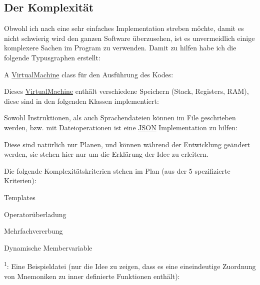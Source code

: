 \subsection*{Der Komplexität}

Obwohl ich nach eine sehr einfaches Implementation streben möchte, damit es nicht schwierig wird den ganzen Software überzusehen, ist es unvermeidlich einige komplexere Sachen im Program zu verwenden. Damit zu hilfen habe ich die folgende Typusgraphen erstellt\+:

A \mbox{\hyperlink{class_virtual_machine}{Virtual\+Machine}} class für den Ausführung des Kodes\+:



Dieses \mbox{\hyperlink{class_virtual_machine}{Virtual\+Machine}} enthält verschiedene Speichern (Stack, Registers, R\+AM), diese sind in den folgenden Klassen implementiert\+:



Sowohl Instruktionen, als auch Sprachendateien können im File geschrieben werden, bzw. mit Dateioperationen ist eine \mbox{\hyperlink{class_j_s_o_n}{J\+S\+ON}} Implementation zu hilfen\+:



Diese sind natürlich nur Planen, und können während der Entwicklung geändert werden, sie stehen hier nur um die Erklärung der Idee zu erleitern.

Die folgende Komplexitätskriterien stehen im Plan (aus der 5 spezifizierte Kriterien)\+:
\begin{DoxyItemize}
\item Templates
\item Operatorüberladung
\item Mehrfachvererbung
\item Dynamische Membervariable 

 \textsuperscript{1}\+: Eine Beispieldatei (nur die Idee zu zeigen, dass es eine eineindeutige Zuordnung von Mnemoniken zu inner definierte Funktionen enthält)\+:
\end{DoxyItemize}

 